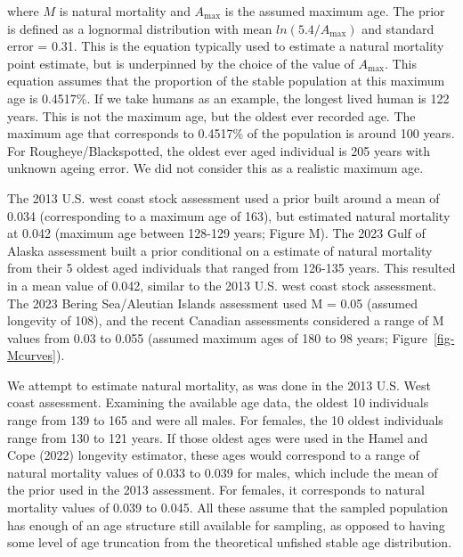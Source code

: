 \documentclass[
]{scrartcl}
\begin{document}
where \(M\) is natural mortality and \({A_{\text{max}}}\) is the assumed
maximum age. The prior is defined as a lognormal distribution with mean
\(ln(5.4/A_{\text{max}})\) and standard error = 0.31. This is the
equation typically used to estimate a natural mortality point estimate,
but is underpinned by the choice of the value of \({A_{\text{max}}}\).
This equation assumes that the proportion of the stable population at
this maximum age is 0.4517\%. If we take humans as an example, the
longest lived human is 122 years. This is not the maximum age, but the
oldest ever recorded age. The maximum age that corresponds to 0.4517\%
of the population is around 100 years. For Rougheye/Blackspotted, the
oldest ever aged individual is 205 years with unknown ageing error. We
did not consider this as a realistic maximum age.

The 2013 U.S. west coast stock assessment used a prior built around a
mean of 0.034 (corresponding to a maximum age of 163), but estimated
natural mortality at 0.042 (maximum age between 128-129 years; Figure
M). The 2023 Gulf of Alaska assessment built a prior conditional on a
estimate of natural mortality from their 5 oldest aged individuals that
ranged from 126-135 years. This resulted in a mean value of 0.042,
similar to the 2013 U.S. west coast stock assessment. The 2023 Bering
Sea/Aleutian Islands assessment used M = 0.05 (assumed longevity of
108), and the recent Canadian assessments considered a range of M values
from 0.03 to 0.055 (assumed maximum ages of 180 to 98 years;
Figure~\ref{fig-Mcurves}).

We attempt to estimate natural mortality, as was done in the 2013 U.S.
West coast assessment. Examining the available age data, the oldest 10
individuals range from 139 to 165 and were all males. For females, the
10 oldest individuals range from 130 to 121 years. If those oldest ages
were used in the Hamel and Cope (2022) longevity estimator, these ages
would correspond to a range of natural mortality values of 0.033 to
0.039 for males, which include the mean of the prior used in the 2013
assessment. For females, it corresponds to natural mortality values of
0.039 to 0.045. All these assume that the sampled population has enough
of an age structure still available for sampling, as opposed to having
some level of age truncation from the theoretical unfished stable age
distribution.
\end{document}
